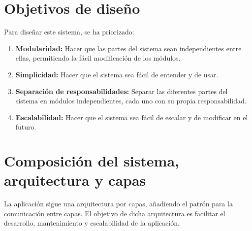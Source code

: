 \documentclass[a4paper,12pt]{article}
\begin{document}
    \section{Objetivos de diseño}\label{sec:objetivos-de-diseno}
    Para diseñar este sistema, se ha priorizado:
    \begin{enumerate}
        \item \textbf{Modularidad:} Hacer que las partes del sistema sean independientes entre ellas, permitiendo la fácil modificación de los módulos.
        \item \textbf{Simplicidad:} Hacer que el sistema sea fácil de entender y de usar.
        \item \textbf{Separación de responsabilidades:} Separar las diferentes partes del sistema en módulos independientes, cada uno con su propia responsabilidad.
        \item \textbf{Escalabilidad:} Hacer que el sistema sea fácil de escalar y de modificar en el futuro.
    \end{enumerate}



    \section{Composición del sistema, arquitectura y capas}\label{sec:composicion-del-sistema-arquitectura-y-capas}
    La aplicación sigue una arquitectura por capas, añadiendo el patrón  para la comunicación entre capas.
    El objetivo de dicha arquitectura es facilitar el desarrollo, mantenimiento y escalabilidad de la aplicación.
\end{document}
